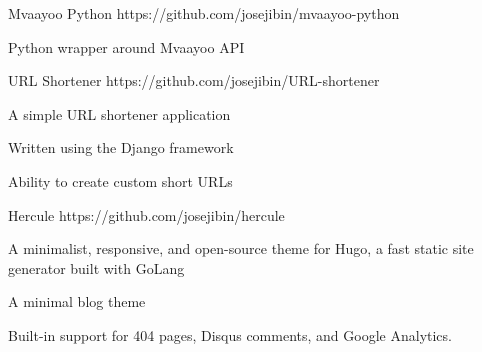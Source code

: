 

\begin{cvprojects}

\cvproject
    {Mvaayoo Python} %
    {https://github.com/josejibin/mvaayoo-python} %
    {
      \begin{cvitems} %
        \item{Python wrapper around Mvaayoo API}
      \end{cvitems}
    }


\cvproject
    {URL Shortener} %
    {https://github.com/josejibin/URL-shortener} %
    {
      \begin{cvitems} %
        \item{A simple URL shortener application}
        \item {Written using the Django framework}
        \item {Ability to create custom short URLs}
      \end{cvitems}
    }

\cvproject
    {Hercule} %
    {https://github.com/josejibin/hercule} %
    {
      \begin{cvitems} %
        \item{A minimalist, responsive, and open-source theme for Hugo, a fast static site generator built with GoLang}
        \item {A minimal blog theme }
        \item {Built-in support for 404 pages, Disqus comments, and Google Analytics.}
      \end{cvitems}
    }






\end{cvprojects}
